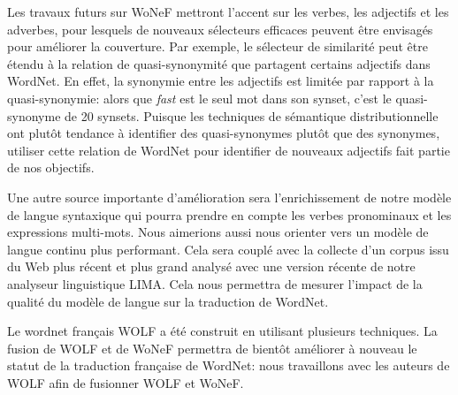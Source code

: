 Les travaux futurs sur WoNeF mettront l'accent sur les verbes, les adjectifs et
les adverbes, pour lesquels de nouveaux sélecteurs efficaces peuvent être
envisagés pour améliorer la couverture. Par exemple, le sélecteur de similarité
peut être étendu à la relation de quasi-synonymité que partagent certains
adjectifs dans WordNet. En effet, la synonymie entre les adjectifs est limitée
par rapport à la quasi-synonymie: alors que \textit{fast} est le seul mot dans
son synset, c'est le quasi-synonyme de 20 synsets. Puisque les techniques de
sémantique distributionnelle ont plutôt tendance à identifier des
quasi-synonymes plutôt que des synonymes, utiliser cette relation de WordNet
pour identifier de nouveaux adjectifs fait partie de nos objectifs.

Une autre source importante d'amélioration sera l'enrichissement de notre
modèle de langue syntaxique qui pourra prendre en compte les verbes pronominaux
et les expressions multi-mots. Nous aimerions aussi nous orienter vers un
modèle de langue continu \citep{haison2012continuous} plus performant. Cela
sera couplé avec la collecte d'un corpus issu du Web plus récent et plus grand
analysé avec une version récente de notre analyseur linguistique LIMA. Cela
nous permettra de mesurer l'impact de la qualité du modèle de langue sur la
traduction de WordNet.

Le wordnet français WOLF a été construit en utilisant plusieurs techniques. La
fusion de WOLF et de WoNeF permettra de bientôt améliorer à nouveau le statut
de la traduction française de WordNet: nous travaillons avec les auteurs de
WOLF afin de fusionner WOLF et WoNeF.

